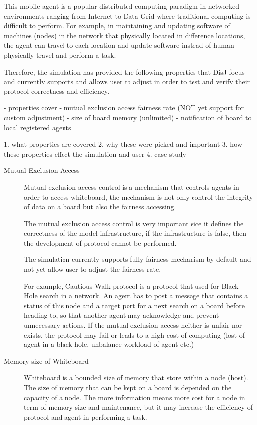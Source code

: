 \begin{description}
This mobile agent is a popular distributed computing paradigm in networked environments ranging from Internet to Data Grid where traditional computing is difficult to perform. For example, in maintaining and updating software of machines (nodes) in the network that physically located in difference locations, the agent can travel to each location and update software instead of human physically travel and perform a task.

Therefore, the simulation has provided the following properties that DisJ focus and currently supports and allows user to adjust in order to test and verify their protocol correctness and efficiency.

- properties cover
	- mutual exclusion access fairness rate (NOT yet support for custom adjustment)
	- size of board memory (unlimited)
    - notification of board to local registered agents

1. what properties are covered
2. why these were picked and important
3. how these properties effect the simulation and user
4. case study


\begin{description}
\item[Mutual Exclusion Access]
Mutual exclusion access control is a mechanism that controls agents in order to access whiteboard, the mechanism is not only control the integrity of data on a board but also the fairness accessing.

The mutual exclusion access control is very important sice it defines the correctness of the model infrastructure, if the infrastructure is false, then the development of protocol cannot be performed.

The simulation currently supports fully fairness mechanism by default and not yet allow user to adjust the fairness rate.

For example, Cautious Walk protocol is a protocol that used for Black Hole search in a network. An agent has to post a message that contains a status of this node and a target port for a next search on a board before heading to, so that another agent may acknowledge and prevent unnecessary actions. If the mutual exclusion access neither is unfair nor exists, the protocol may fail or leads to a high cost of computing (lost of agent in a black hole, unbalance workload of agent etc.)


\item[Memory size of Whiteboard]
Whiteboard is a bounded size of memory that store within a node (host). The size of memory that can be kept on a board is depended on the capacity of a node. The more information means more cost for a node in term of memory size and maintenance, but it may increase the efficiency of protocol and agent in performing a task.


\end{description}
\end{description}
